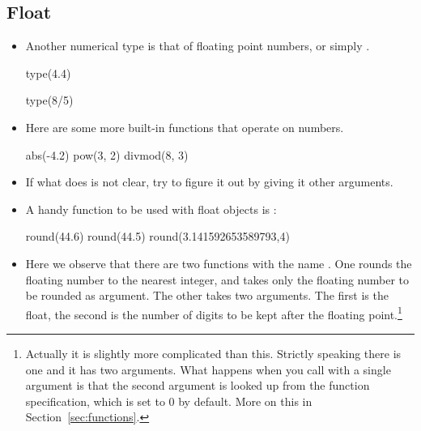 \documentclass[a4paper]{article}
\begin{document}
\subsection{Float}
\begin{itemize}
\item Another numerical type is that of floating point numbers, or simply
.  

\begin{ucodeframe}
\begin{pyconsole}
type(4.4)
\end{pyconsole}
\end{ucodeframe}

\begin{ucodeframe}
\begin{pyconsole}
type(8/5)
\end{pyconsole}
\end{ucodeframe}

\item Here are some more built-in functions that operate on numbers. 

\begin{ucodeframe}
\begin{pyconsole}
abs(-4.2)
pow(3, 2)
divmod(8, 3)
\end{pyconsole}
\end{ucodeframe}

\item If what  does is not clear, try to figure it out by giving it 
other arguments.

\item A handy function to be used with float objects is :

\begin{ucodeframe}
\begin{pyconsole}
round(44.6)
round(44.5)
round(3.141592653589793,4)
\end{pyconsole}
\end{ucodeframe}

\item Here we observe that there are two functions with the name .
One rounds the floating number to the nearest integer, and takes only the
floating number to be rounded as argument. The other  takes two
arguments. The first is the float, the second is the number of digits to be kept
after the floating point.\footnote{Actually it is slightly more complicated than
this. Strictly speaking there is one  and it has two arguments. What
happens when you call  with a single argument is that the second
argument is looked up from the function specification, which is set to 
0 by default. More on this in Section~\ref{sec:functions}.}


\end{itemize}
\end{document}
